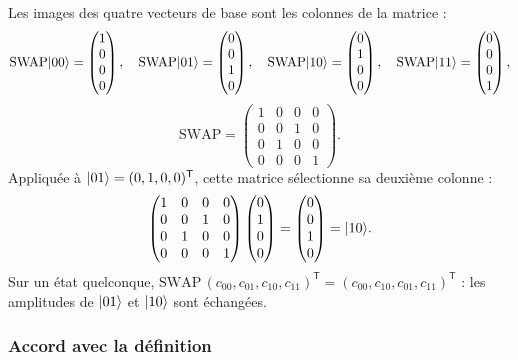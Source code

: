 Les images des quatre vecteurs de base sont les colonnes de la matrice :
\[
  \mathrm{SWAP}|00\rangle=\begin{pmatrix}1\\0\\0\\0\end{pmatrix},\quad
  \mathrm{SWAP}|01\rangle=\begin{pmatrix}0\\0\\1\\0\end{pmatrix},\quad
  \mathrm{SWAP}|10\rangle=\begin{pmatrix}0\\1\\0\\0\end{pmatrix},\quad
  \mathrm{SWAP}|11\rangle=\begin{pmatrix}0\\0\\0\\1\end{pmatrix},
\]
\[
  \mathrm{SWAP}=\begin{pmatrix}
    1 & 0 & 0 & 0\\ 0 & 0 & 1 & 0\\ 0 & 1 & 0 & 0\\ 0 & 0 & 0 & 1
  \end{pmatrix}.
\]
Appliquée à $|01\rangle=(0,1,0,0)^{\mathsf T}$, cette matrice sélectionne sa deuxième colonne :
\[
  \begin{pmatrix}
    1 & 0 & 0 & 0\\ 0 & 0 & 1 & 0\\ 0 & 1 & 0 & 0\\ 0 & 0 & 0 & 1
  \end{pmatrix}
  \begin{pmatrix}0\\1\\0\\0\end{pmatrix}
  =\begin{pmatrix}0\\0\\1\\0\end{pmatrix}=|10\rangle.
\]
Sur un état quelconque, $\mathrm{SWAP}\,(c_{00},c_{01},c_{10},c_{11})^{\mathsf T}
=(c_{00},c_{10},c_{01},c_{11})^{\mathsf T}$ : les amplitudes de $|01\rangle$ et $|10\rangle$
sont échangées.

\subsubsection{Accord avec la définition}

